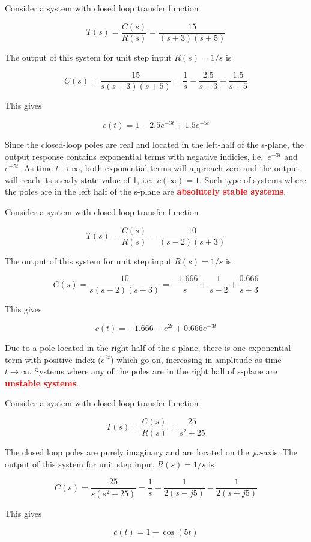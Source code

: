 \documentclass[
  14pt,
  a4paper,
  oneside,
  open=any,
  a4paper,
  14pt]{report}
\begin{document}
Consider a system with closed loop transfer function

\[
    T(s) = \dfrac{C(s)}{R(s)} = \dfrac{15}{(s+3)(s+5)}
\]

The output of this system for unit step input \(R(s) = 1/s\) is

\[
    C(s) = \dfrac{15}{s(s+3)(s+5)} = \dfrac{1}{s} - \dfrac{2.5}{s+3} + \dfrac{1.5}{s+5}
\]

This gives

\[
    c(t) = 1 - 2.5e^{-3t} + 1.5e^{-5t}
\]

Since the closed-loop poles are real and located in the left-half of the
s-plane, the output response contains exponential terms with negative
indicies, i.e.~\(e^{-3t}\) and \(e^{-5t}\). As time \(t \to \infty\),
both exponential terms will approach zero and the output will reach its
steady state value of 1, i.e.~\(c(\infty) = 1\). Such type of systems
where the poles are in the left half of the s-plane are
\textcolor{red}{\textbf{absolutely stable systems}}.

Consider a system with closed loop transfer function

\[
    T(s) = \dfrac{C(s)}{R(s)} = \dfrac{10}{(s-2)(s+3)}
\]

The output of this system for unit step input \(R(s) = 1/s\) is

\[
    C(s) = \dfrac{10}{s(s-2)(s+3)} = \dfrac{-1.666}{s} + \dfrac{1}{s-2} + \dfrac{0.666}{s+3}
\]

This gives

\[
    c(t) = -1.666 + e^{2t} + 0.666e^{-3t}
\]

Due to a pole located in the right half of the s-plane, there is one
exponential term with positive index (\(e^{2t}\)) which go on,
increasing in amplitude as time \(t \to \infty\). Systems where any of
the poles are in the right half of s-plane are
\textcolor{red}{\textbf{unstable systems}}.

Consider a system with closed loop transfer function

\[
    T(s) = \dfrac{C(s)}{R(s)} = \dfrac{25}{s^2 + 25}
\]

The closed loop poles are purely imaginary and are located on the
\(j\omega\)-axis. The output of this system for unit step input
\(R(s) = 1/s\) is

\[
    C(s) = \dfrac{25}{s(s^2 + 25)} = \dfrac{1}{s} - \dfrac{1}{2(s-j5)}-\dfrac{1}{2(s+j5)}
\]

This gives

\[
    c(t) = 1 - \cos(5t)
\]
\end{document}
